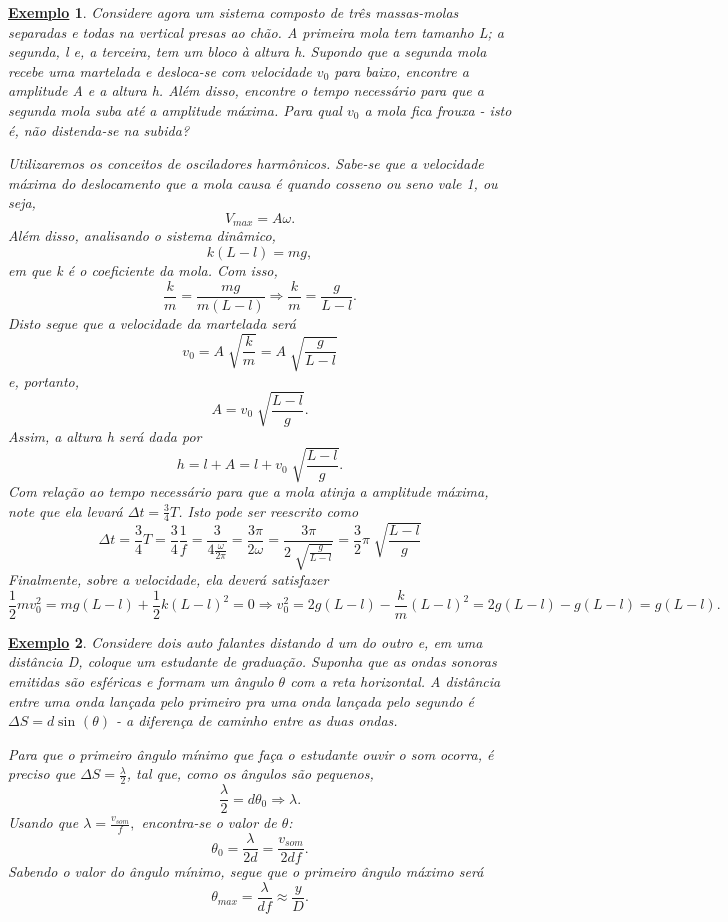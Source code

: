 \documentclass{article}
\newtheorem{example}{\underline{Exemplo}}
\begin{document}
\begin{example}
 Considere agora um sistema composto de três massas-molas separadas e todas na vertical presas ao chão. A primeira mola tem tamanho L; a segunda, l e, a terceira,
tem um bloco à altura h. Supondo que a segunda mola recebe uma martelada e desloca-se com velocidade \(v_{0}\) para baixo, encontre a amplitude A e a altura h. Além disso,
encontre o tempo necessário para que a segunda mola suba até a amplitude máxima. Para qual \(v_{0}\) a mola fica frouxa - isto é, não distenda-se na subida?

 Utilizaremos os conceitos de osciladores harmônicos. Sabe-se que a velocidade máxima do deslocamento que a mola causa é quando cosseno ou seno vale 1, ou seja, 
   \[
     V_{max} = A\omega .
   \]
 Além disso, analisando o sistema dinâmico, 
   \[
     k(L-l) = mg,
   \]
em que k é o coeficiente da mola. Com isso, 
   \[
     \frac{k}{m} = \frac{mg}{m(L-l)} \Rightarrow \frac{k}{m} = \frac{g}{L-l}.
   \]
 Disto segue que a velocidade da martelada será 
   \[
     v_{0}=A\sqrt[]{\frac{k}{m}} = A\sqrt[]{\frac{g}{L-l}}
   \]
e, portanto, 
   \[
     A = v_{0}\sqrt[]{\frac{L-l}{g}}.
   \]
 Assim, a altura h será dada por 
   \[
     h = l + A = l + v_{0}\sqrt[]{\frac{L-l}{g}}.
   \]
 Com relação ao tempo necessário para que a mola atinja a amplitude máxima, note que ela levará \(\Delta t = \frac{3}{4}T\). Isto pode ser reescrito como 
   \[
     \Delta t = \frac{3}{4}T = \frac{3}{4}\frac{1}{f} = \frac{3}{4\frac{\omega }{2\pi }} = \frac{3\pi }{2\omega } = \frac{3\pi }{2\sqrt[]{\frac{g}{L-l}}} = \frac{3}{2}\pi \sqrt[]{\frac{L-l}{g}}
   \]
 Finalmente, sobre a velocidade, ela deverá satisfazer 
   \[
     \frac{1}{2}mv_{0}^{2} = mg(L-l) + \frac{1}{2}k(L-l)^{2} = 0 \Rightarrow v_{0}^{2} = 2g(L-l) - \frac{k}{m}(L-l)^{2} = 2g(L-l)-g(L-l) = g(L-l).
   \]
\end{example}
\begin{example}
Considere dois auto falantes distando d um do outro e, em uma distância D, coloque um estudante de graduação. Suponha que as ondas sonoras emitidas são esféricas e formam
um ângulo \(\theta \) com a reta horizontal. A distância entre uma onda lançada pelo primeiro pra uma onda lançada pelo segundo é \(\Delta S = d\sin^{}{(\theta )}\) - a diferença de caminho entre
as duas ondas.

Para que o primeiro ângulo mínimo que faça o estudante ouvir o som ocorra, é preciso que \(\Delta S = \frac{\lambda }{2}\), tal que, como os ângulos são pequenos,
 \[
   \frac{\lambda }{2} = d\theta_{0} \Rightarrow \lambda.
 \]
Usando que \(\lambda  = \frac{v_{som}}{f},\) encontra-se o valor de \(\theta \): 
 \[
   \theta_{0} = \frac{\lambda }{2d} = \frac{v_{som}}{2df}.
 \]
Sabendo o valor do ângulo mínimo, segue que o primeiro ângulo máximo será 
 \[
   \theta_{max} = \frac{\lambda }{df}\approx \frac{y}{D}.
 \]
\end{example}
\end{document}

